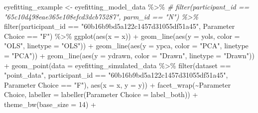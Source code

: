 \documentclass[print]{nuthesis}
\newenvironment{Shaded}{\begin{snugshade}}{\end{snugshade}}
\newcommand{\AttributeTok}[1]{\textcolor[rgb]{0.77,0.63,0.00}{#1}}
\newcommand{\CommentTok}[1]{\textcolor[rgb]{0.56,0.35,0.01}{\textit{#1}}}
\newcommand{\DecValTok}[1]{\textcolor[rgb]{0.00,0.00,0.81}{#1}}
\newcommand{\FunctionTok}[1]{\textcolor[rgb]{0.00,0.00,0.00}{#1}}
\newcommand{\NormalTok}[1]{#1}
\newcommand{\OtherTok}[1]{\textcolor[rgb]{0.56,0.35,0.01}{#1}}
\newcommand{\SpecialCharTok}[1]{\textcolor[rgb]{0.00,0.00,0.00}{#1}}
\newcommand{\StringTok}[1]{\textcolor[rgb]{0.31,0.60,0.02}{#1}}
\begin{document}
\begin{Shaded}
\begin{Highlighting}[]
\NormalTok{eyefitting\_example }\OtherTok{\textless{}{-}}\NormalTok{ eyefitting\_model\_data }\SpecialCharTok{\%\textgreater{}\%}
  \CommentTok{\# filter(participant\_id == "65c10d498eae365e108efcd3dcb75287", parm\_id == "N") \%\textgreater{}\%}
  \FunctionTok{filter}\NormalTok{(participant\_id }\SpecialCharTok{==} \StringTok{"60b16b9bd5a122c1457d31055df51a45"}\NormalTok{, }\StringTok{\textasciigrave{}}\AttributeTok{Parameter Choice}\StringTok{\textasciigrave{}} \SpecialCharTok{==} \StringTok{"F"}\NormalTok{) }\SpecialCharTok{\%\textgreater{}\%}
  \FunctionTok{ggplot}\NormalTok{(}\FunctionTok{aes}\NormalTok{(}\AttributeTok{x =}\NormalTok{ x)) }\SpecialCharTok{+}
  \FunctionTok{geom\_line}\NormalTok{(}\FunctionTok{aes}\NormalTok{(}\AttributeTok{y =}\NormalTok{ yols, }\AttributeTok{color =} \StringTok{"OLS"}\NormalTok{, }\AttributeTok{linetype =} \StringTok{"OLS"}\NormalTok{)) }\SpecialCharTok{+}
  \FunctionTok{geom\_line}\NormalTok{(}\FunctionTok{aes}\NormalTok{(}\AttributeTok{y =}\NormalTok{ ypca, }\AttributeTok{color =} \StringTok{"PCA"}\NormalTok{, }\AttributeTok{linetype =} \StringTok{"PCA"}\NormalTok{)) }\SpecialCharTok{+}
  \FunctionTok{geom\_line}\NormalTok{(}\FunctionTok{aes}\NormalTok{(}\AttributeTok{y =}\NormalTok{ ydrawn, }\AttributeTok{color =} \StringTok{"Drawn"}\NormalTok{, }\AttributeTok{linetype =} \StringTok{"Drawn"}\NormalTok{)) }\SpecialCharTok{+}
  \FunctionTok{geom\_point}\NormalTok{(}\AttributeTok{data =}\NormalTok{ eyefitting\_simulated\_data }\SpecialCharTok{\%\textgreater{}\%}
               \FunctionTok{filter}\NormalTok{(dataset }\SpecialCharTok{==} \StringTok{"point\_data"}\NormalTok{, participant\_id }\SpecialCharTok{==} \StringTok{"60b16b9bd5a122c1457d31055df51a45"}\NormalTok{, }\StringTok{\textasciigrave{}}\AttributeTok{Parameter Choice}\StringTok{\textasciigrave{}} \SpecialCharTok{==} \StringTok{"F"}\NormalTok{),}
             \FunctionTok{aes}\NormalTok{(}\AttributeTok{x =}\NormalTok{ x, }\AttributeTok{y =}\NormalTok{ y)) }\SpecialCharTok{+}
  \FunctionTok{facet\_wrap}\NormalTok{(}\SpecialCharTok{\textasciitilde{}}\StringTok{\textasciigrave{}}\AttributeTok{Parameter Choice}\StringTok{\textasciigrave{}}\NormalTok{, }\AttributeTok{labeller =} \FunctionTok{labeller}\NormalTok{(}\StringTok{\textasciigrave{}}\AttributeTok{Parameter Choice}\StringTok{\textasciigrave{}} \OtherTok{=}\NormalTok{ label\_both)) }\SpecialCharTok{+}
  \FunctionTok{theme\_bw}\NormalTok{(}\AttributeTok{base\_size =} \DecValTok{14}\NormalTok{) }\SpecialCharTok{+}

\end{Highlighting}
\end{Shaded}
\end{document}
